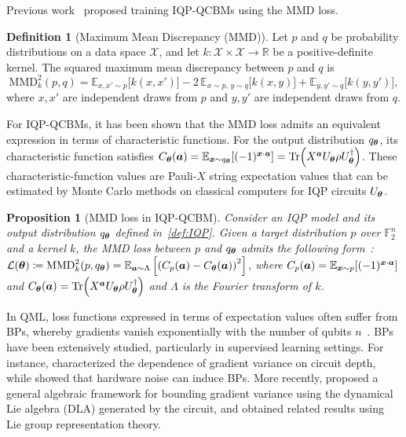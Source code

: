 \documentclass{article}
\theoremstyle{plain}
\newtheorem{proposition}[theorem]{Proposition}
\theoremstyle{definition}
\newtheorem{definition}[theorem]{Definition}
\theoremstyle{remark}
\begin{document}
Previous work~\citet{recioarmengol25} proposed training IQP-QCBMs using the MMD loss. 

\begin{definition}[Maximum Mean Discrepancy (MMD)]
\label{def:mmd-kernel}
Let $p$ and $q$ be probability distributions on a data space $\mathcal{X}$, and let $k\colon\mathcal{X}\times\mathcal{X}\to\mathbb{R}$ be a positive-definite kernel. The squared maximum mean discrepancy between $p$ and $q$ is
\begin{equation}
\mathrm{MMD}_k^2(p,q)
=\mathbb{E}_{x,x'\sim p}\big[k(x,x')\big]
-2\,\mathbb{E}_{x\sim p,\,y\sim q}\big[k(x,y)\big]
+\mathbb{E}_{y,y'\sim q}\big[k(y,y')\big],
\end{equation}
where $x,x'$ are independent draws from $p$ and $y,y'$ are independent draws from $q$.
\end{definition}

For IQP-QCBMs, it has been shown that the MMD loss admits an equivalent expression in terms of characteristic functions. For the output distribution $q_{\bm{\theta}}$, its characteristic function satisfies $C_{\bm{\theta}}({\bm{a}})=\operatorname*{\mathbb{E}}_{{\bm{x}} \sim q_{\bm{\theta}}}[(-1)^{{\bm{x}} \cdot {\bm{a}}}]=\Tr(X^{{\bm{a}}}U_{\bm{\theta}}\rho U_{\bm{\theta}}^\dagger)$. These characteristic-function values are Pauli-$X$ string expectation values that can be estimated by Monte Carlo methods on classical computers for IQP circuits $U_{\bm{\theta}}$.

\begin{proposition} [MMD loss in IQP-QCBM]\label{prop:mmd-loss}
Consider an IQP model and its output distribution $q_{\bm{\theta}}$ defined in~\cref{def:IQP}. Given a target distribution $p$ over $\mathbb{F}_2^n$ and a kernel $k$, the MMD loss between $p$ and $q_{\bm{\theta}}$ admits the following form~\citep{rudolph24, recioarmengol25}: $\mathcal{L}({\bm{\theta}}) \coloneqq \mathrm{MMD}^2_k(p, q_{\bm{\theta}}) = \operatorname*{\mathbb{E}}_{{\bm{a}} \sim \Lambda} \left[ \left( C_p({\bm{a}}) - C_{\bm{\theta}}({\bm{a}}) \right)^2 \right]$,
where $C_p({\bm{a}})  = \operatorname*{\mathbb{E}}_{{\bm{x}} \sim p}[(-1)^{{\bm{x}} \cdot {\bm{a}}}]$ and $C_{\bm{\theta}}({\bm{a}})=\Tr(X^{{\bm{a}}}U_{\bm{\theta}}\rho U_{\bm{\theta}}^\dagger)$ and $\Lambda$ is the Fourier transform of $k$.  
\end{proposition}
In QML, loss functions expressed in terms of expectation values often suffer from BPs, whereby gradients vanish exponentially with the number of qubits $n$~\citep{mcclean18}. BPs have been extensively studied, particularly in supervised learning settings. For instance, \citet{Cerezo21} characterized the dependence of gradient variance on circuit depth, while \citet{Wang21} showed that hardware noise can induce BPs. More recently, \citet{Ragone24} proposed a general algebraic framework for bounding gradient variance using the dynamical Lie algebra (DLA) generated by the circuit, and \citet{fontana2024characterizing} obtained related results using Lie group representation theory.
\end{document}
